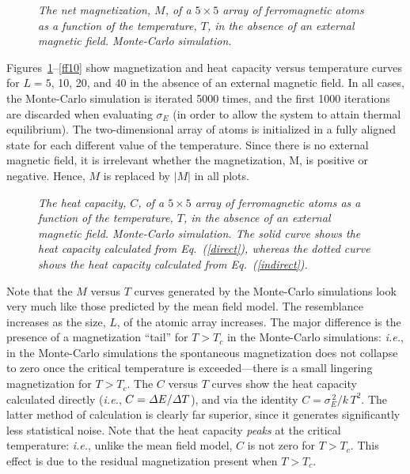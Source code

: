 \begin{figure}
\epsfysize=3in
\centerline{}
\caption{\em The net magnetization, $M$, of a  $5\times 5$ array of ferromagnetic atoms as a
function of the temperature, $T$, in the absence of an external magnetic
field. Monte-Carlo simulation.}\label{ff7}
\end{figure}

Figures~\ref{ff7}--\ref{ff10} show magnetization and heat capacity versus temperature
curves for $L=5$, 10, 20, and 40 in the absence of an
external magnetic field. In all cases, the Monte-Carlo simulation is iterated 5000 times,
and the first 1000 iterations are discarded when evaluating $\sigma_E$ (in order to
allow the system to attain thermal equilibrium). The two-dimensional array of atoms is
initialized in a fully aligned state for each different value of the temperature. Since there is
no external magnetic field, it is irrelevant whether the magnetization, M,  is
positive or negative. Hence,  $M$ is replaced by $|M|$ in all plots.

\begin{figure}
\epsfysize=3in
\centerline{}
\caption{\em  The heat capacity, $C$, of a  $5\times 5$ array of ferromagnetic atoms as a
function of the temperature, $T$, in the absence of an external magnetic
field. Monte-Carlo simulation. The solid curve shows the heat capacity calculated
from Eq.~(\ref{direct}), whereas the dotted curve shows the heat capacity calculated
from Eq.~(\ref{indirect}).}\label{ff7a}
\end{figure}

Note that the $M$ versus $T$ curves generated by the Monte-Carlo simulations
look very much like those predicted by the
mean field model. The resemblance increases as the size, $L$, of the atomic
array increases. The major difference is the presence of a magnetization ``tail'' for $T>T_c$ in
the Monte-Carlo simulations: {\em i.e.}, in the Monte-Carlo simulations the spontaneous magnetization
does not collapse to zero once the critical temperature is exceeded---there is
a small lingering magnetization for $T>T_c$. 
The $C$ versus $T$ curves show the heat capacity calculated directly ({\em i.e.}, $C={\mit\Delta E}/{\mit\Delta T}$),
and via the identity $C=\sigma_E^{\,2}/k\,T^2$. The latter method of calculation is
clearly far superior, since it generates significantly less statistical noise. Note that the heat capacity
{\em peaks} at the critical temperature: {\em i.e.}, unlike the mean field model, $C$ is
not zero for $T>T_c$. This effect is due to the residual magnetization present when $T>T_c$. 

